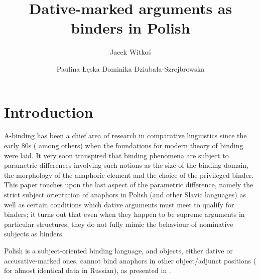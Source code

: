 \documentclass[output=paper,modfonts,nonflat
]{langsci/langscibook}
\author{
Jacek Witkoś\affiliation{Adam Mickiewicz University in Poznań}\orcid{ 0000-0001-6462-3117}\and 
 Paulina Łęska\affiliation{Adam Mickiewicz University in Poznań}\orcid{0000-0002-8817-9409}\lastand 
 Dominika Dziubała-Szrejbrowska\affiliation{Adam Mickiewicz University in Poznań}}
\title{Dative-marked arguments as binders in Polish}
\begin{document}
\maketitle


\section{Introduction}\label{sec:witkos:s1}

\sloppy A-binding has been a chief area of research in comparative linguistics since the early 80s (\citealt{chomsky1981,chomsky1986,manzini1987,bellettirizzi1988,rappaport1986,willim1989,burzio1996,hellan1988,progovac1992,progovac1993,avrutin1994} among others) when the foundations for modern theory of binding were laid. It very soon transpired that binding phenomena are subject to parametric differences involving such notions as the size of the binding domain, the morphology of the anaphoric element and the choice of the privileged binder. This paper touches upon the last aspect of the parametric difference, namely the strict subject orientation of anaphors in Polish (and other Slavic languages) as well as certain conditions which dative arguments must meet to qualify for binders; it turns out that even when they happen to be supreme arguments in particular structures, they do not fully mimic the behaviour of nominative subjects as binders.

Polish is a subject-oriented binding language, and objects, either dative or accusative-marked ones, cannot bind anaphors in other object/adjunct positions (\citealt{willim1989,reinders1991,rappaport1986} for almost identical data in Russian), as presented in .
\end{document}
